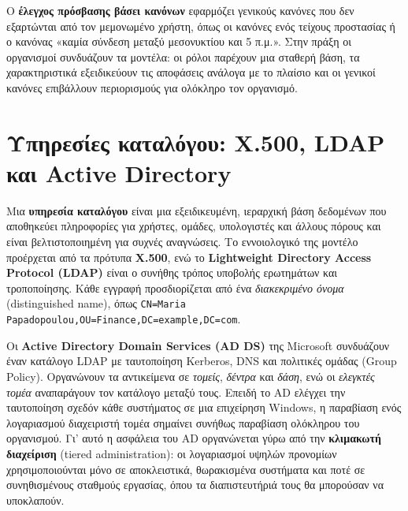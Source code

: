\documentclass[11pt,openany]{book}
\begin{document}
Ο \textbf{έλεγχος πρόσβασης βάσει κανόνων} εφαρμόζει γενικούς κανόνες που δεν εξαρτώνται από τον μεμονωμένο χρήστη, όπως οι κανόνες ενός τείχους προστασίας ή ο κανόνας «καμία σύνδεση μεταξύ μεσονυκτίου και 5 π.μ.». Στην πράξη οι οργανισμοί συνδυάζουν τα μοντέλα: οι ρόλοι παρέχουν μια σταθερή βάση, τα χαρακτηριστικά εξειδικεύουν τις αποφάσεις ανάλογα με το πλαίσιο και οι γενικοί κανόνες επιβάλλουν περιορισμούς για ολόκληρο τον οργανισμό.

\section{Υπηρεσίες καταλόγου: X.500, LDAP και Active Directory}\label{sec:8.4}
Μια \textbf{υπηρεσία καταλόγου} είναι μια εξειδικευμένη, ιεραρχική βάση δεδομένων που αποθηκεύει πληροφορίες για χρήστες, ομάδες, υπολογιστές και άλλους πόρους και είναι βελτιστοποιημένη για συχνές αναγνώσεις. Το εννοιολογικό της μοντέλο προέρχεται από τα πρότυπα \textbf{X.500}, ενώ το \textbf{Lightweight Directory Access Protocol (LDAP)} είναι ο συνήθης τρόπος υποβολής ερωτημάτων και τροποποίησης. Κάθε εγγραφή προσδιορίζεται από ένα \emph{διακεκριμένο όνομα} (distinguished name), όπως \texttt{CN=Maria Papadopoulou,OU=Finance,DC=example,DC=com}.

Οι \textbf{Active Directory Domain Services (AD DS)} της Microsoft συνδυάζουν έναν κατάλογο LDAP με ταυτοποίηση Kerberos, DNS και πολιτικές ομάδας (Group Policy). Οργανώνουν τα αντικείμενα σε \emph{τομείς}, \emph{δέντρα} και \emph{δάση}, ενώ οι \emph{ελεγκτές τομέα} αναπαράγουν τον κατάλογο μεταξύ τους. Επειδή το AD ελέγχει την ταυτοποίηση σχεδόν κάθε συστήματος σε μια επιχείρηση Windows, η παραβίαση ενός λογαριασμού διαχειριστή τομέα σημαίνει συνήθως παραβίαση ολόκληρου του οργανισμού. Γι' αυτό η ασφάλεια του AD οργανώνεται γύρω από την \textbf{κλιμακωτή διαχείριση} (tiered administration): οι λογαριασμοί υψηλών προνομίων χρησιμοποιούνται μόνο σε αποκλειστικά, θωρακισμένα συστήματα και ποτέ σε συνηθισμένους σταθμούς εργασίας, όπου τα διαπιστευτήριά τους θα μπορούσαν να υποκλαπούν.
\end{document}

